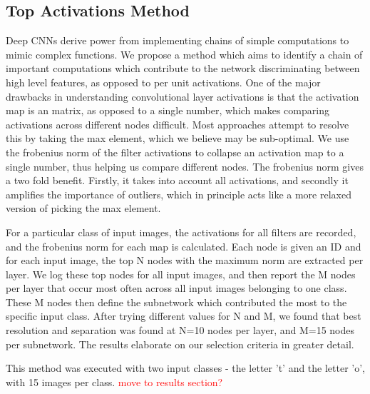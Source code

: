 \documentclass[10pt,twocolumn,letterpaper]{article}
\begin{document}
\subsection{Top Activations Method}
Deep CNNs derive power from implementing chains of simple computations to mimic complex functions. We propose a method which aims to identify a chain of important computations which contribute to the network discriminating between high level features, as opposed to per unit activations. One of the major drawbacks in understanding convolutional layer activations is that the activation map is an matrix, as opposed to a single number, which makes comparing activations across different nodes difficult. Most approaches attempt to resolve this by taking the max element, which we believe may be sub-optimal. We use the frobenius norm of the filter activations to collapse an activation map to a single number, thus helping us compare different nodes. The frobenius norm gives a two fold benefit. Firstly, it takes into account all activations, and secondly it amplifies the importance of outliers, which in principle acts like a more relaxed version of picking the max element. 

For a particular class of input images, the activations for all filters are recorded, and the frobenius norm for each map is calculated. Each node is given an ID and for each input image, the top N nodes with the maximum norm are extracted per layer. We log these top nodes for all input images, and then report the M nodes per layer that occur most often across all input images belonging to one class. These M nodes then define the subnetwork which contributed the most to the specific input class. After trying different values for N and M, we found that best resolution and separation was found at N=10 nodes per layer, and M=15 nodes per subnetwork. The results elaborate on our selection criteria in greater detail.

This method was executed with two input classes - the letter 't' and the letter 'o', with 15 images per class. \textcolor{red}{move to results section?}
\end{document}
